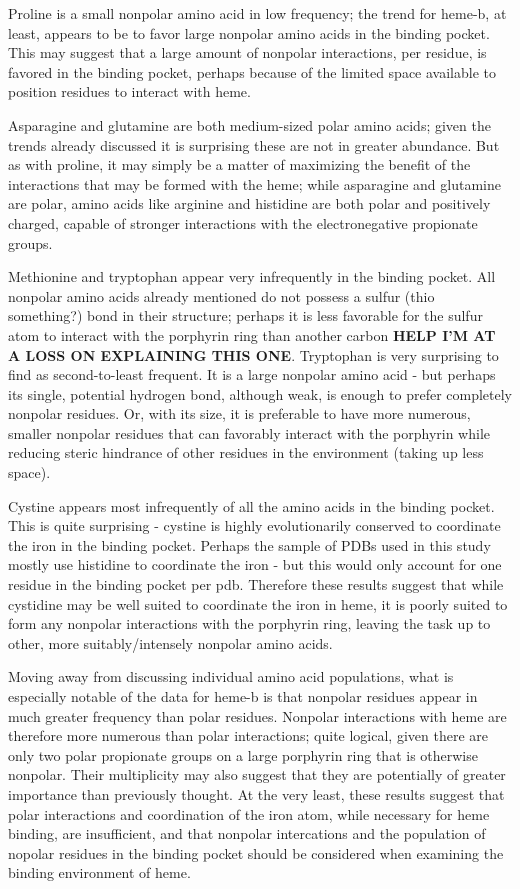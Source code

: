 \documentclass[a4paper, nobind]{templates/ociamthesis}
\begin{document}
Proline is a small nonpolar amino acid in low frequency; the trend for heme-b, at least, appears to be to favor large nonpolar amino acids in the binding pocket. This may suggest that a large amount of nonpolar interactions, per residue, is favored in the binding pocket, perhaps because of the limited space available to position residues to interact with heme.

Asparagine and glutamine are both medium-sized polar amino acids; given the trends already discussed it is surprising these are not in greater abundance. But as with proline, it may simply be a matter of maximizing the benefit of the interactions that may be formed with the heme; while asparagine and glutamine are polar, amino acids like arginine and histidine are both polar and positively charged, capable of stronger interactions with the electronegative propionate groups.

Methionine and tryptophan appear very infrequently in the binding pocket. All nonpolar amino acids already mentioned do not possess a sulfur (thio something?) bond in their structure; perhaps it is less favorable for the sulfur atom to interact with the porphyrin ring than another carbon \textbf{HELP I'M AT A LOSS ON EXPLAINING THIS ONE}. Tryptophan is very surprising to find as second-to-least frequent. It is a large nonpolar amino acid - but perhaps its single, potential hydrogen bond, although weak, is enough to prefer completely nonpolar residues. Or, with its size, it is preferable to have more numerous, smaller nonpolar residues that can favorably interact with the porphyrin while reducing steric hindrance of other residues in the environment (taking up less space).

Cystine appears most infrequently of all the amino acids in the binding pocket. This is quite surprising - cystine is highly evolutionarily conserved to coordinate the iron in the binding pocket. Perhaps the sample of PDBs used in this study mostly use histidine to coordinate the iron - but this would only account for one residue in the binding pocket per pdb. Therefore these results suggest that while cystidine may be well suited to coordinate the iron in heme, it is poorly suited to form any nonpolar interactions with the porphyrin ring, leaving the task up to other, more suitably/intensely nonpolar amino acids.

Moving away from discussing individual amino acid populations, what is especially notable of the data for heme-b is that nonpolar residues appear in much greater frequency than polar residues. Nonpolar interactions with heme are therefore more numerous than polar interactions; quite logical, given there are only two polar propionate groups on a large porphyrin ring that is otherwise nonpolar. Their multiplicity may also suggest that they are potentially of greater importance than previously thought. At the very least, these results suggest that polar interactions and coordination of the iron atom, while necessary for heme binding, are insufficient, and that nonpolar intercations and the population of nopolar residues in the binding pocket should be considered when examining the binding environment of heme.
\end{document}
